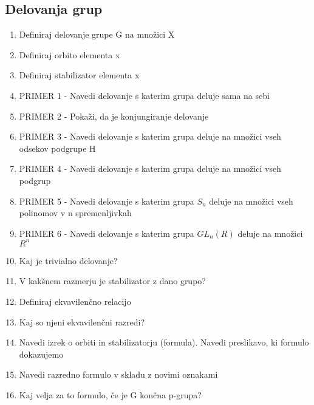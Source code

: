 \documentclass{article}
\begin{document}
    \subsection{Delovanja grup}
    \begin{enumerate}
        \item Definiraj delovanje grupe G na množici X
        \item Definiraj orbito elementa x
        \item Definiraj stabilizator elementa x
        \item PRIMER 1 - Navedi delovanje s katerim grupa deluje sama na sebi
        \item PRIMER 2 - Pokaži, da je konjungiranje delovanje
        \item PRIMER 3 - Navedi delovanje s katerim grupa deluje na množici vseh odsekov podgrupe H
        \item PRIMER 4 - Navedi delovanje s katerim grupa deluje na množici vseh podgrup
        \item PRIMER 5 - Navedi delovanje s katerim grupa $S_n$ deluje na množici vseh polinomov v n spremenljivkah
        \item PRIMER 6 - Navedi delovanje s katerim grupa $GL_n(R)$ deluje na množici $R^n$
        \item Kaj je trivialno delovanje?
        \item V kakšnem razmerju je stabilizator z dano grupo?
        \item Definiraj ekvavilenčno relacijo
        \item Kaj so njeni ekvavilenčni razredi?
        \item Navedi izrek o orbiti in stabilizatorju (formula). Navedi preslikavo, ki formulo dokazujemo
        \item Navedi razredno formulo v skladu z novimi oznakami
        \item Kaj velja za to formulo, če je G končna p-grupa?
    \end{enumerate}
\end{document}
